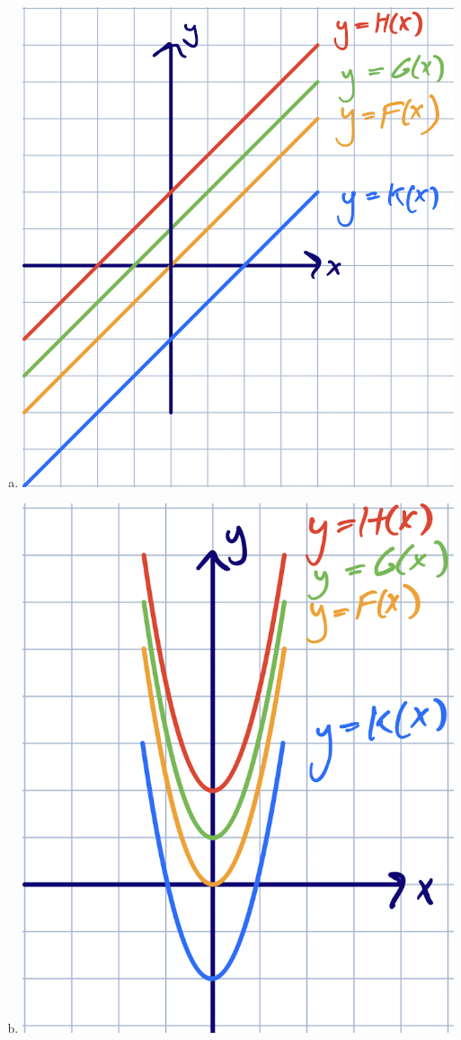 \documentclass[11pt]{exam}
\begin{document}
\begin{questions}
\begin{solution}
\begin{multicols}{2}
\begin{enumerate}[(a)]
    \item \includegraphics[scale=0.4]{Figures/1b}
    \item \includegraphics[scale=0.4]{Figures/1c}

\end{enumerate}
\end{multicols}
\end{solution}
\end{questions}
\end{document}
